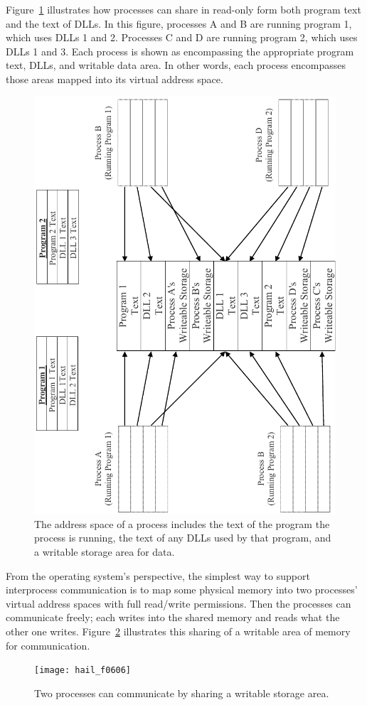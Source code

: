 Figure~\ref{scan-6-3} illustrates how processes can share in read-only
form both program text and the text of DLLs.  In this figure,
processes A and B are running program 1, which uses DLLs 1 and 2.
Processes C and D are running program 2, which uses DLLs 1 and 3.
Each process is shown as encompassing the appropriate program text,
DLLs, and writable data area.  In other words, each process encompasses
those areas mapped into its virtual address space.
\begin{figure}
\centerline{\includegraphics{hail_f0605}}
\caption{The address space of a process includes the text of the
  program the process is running, the text of any DLLs used by that
  program, and a writable storage area for data.}
\label{scan-6-3}
\end{figure}


From the operating system's perspective, the simplest way to support
interprocess communication is to map some physical memory into two
processes' virtual address spaces with full read/write permissions.
Then the processes can communicate freely; each
writes into the shared memory and reads what the other one writes.
Figure~\ref{scan-6-4} illustrates this sharing of a writable
area of memory for communication.
\begin{figure}
\centerline{\texttt{[image: hail\_f0606]}}
\caption{Two processes can communicate by sharing a writable storage area.}
\label{scan-6-4}
\end{figure}

